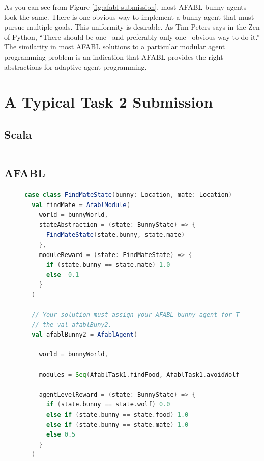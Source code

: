 As you can see from Figure \ref{fig:afabl-submission}, most AFABL bunny agents look the same. There is one obvious way to implement a bunny agent that must pursue multiple goals. This uniformity is desirable. As Tim Peters says in the Zen of Python, ``There should be one-- and preferably only one --obvious way to do it.'' The similarity in most AFABL solutions to a particular modular agent programming problem is an indication that AFABL provides the right abstractions for adaptive agent programming.

\section{A Typical Task 2 Submission}

\subsection{Scala}

\begin{figure}[h]
\begin{center}

\begin{lstlisting}[language=Scala]

\end{lstlisting}

\caption{}
\end{center}
\label{fig:scala-task2-submission}
\end{figure}


\subsection{AFABL}

\begin{figure}[h]
\begin{center}

\begin{lstlisting}[language=Scala]
  case class FindMateState(bunny: Location, mate: Location)
  val findMate = AfablModule(
    world = bunnyWorld,
    stateAbstraction = (state: BunnyState) => {
      FindMateState(state.bunny, state.mate)
    },
    moduleReward = (state: FindMateState) => {
      if (state.bunny == state.mate) 1.0
      else -0.1
    }
  )

  // Your solution must assign your AFABL bunny agent for Task 2 to
  // the val afablBuny2.
  val afablBunny2 = AfablAgent(

    world = bunnyWorld,

    modules = Seq(AfablTask1.findFood, AfablTask1.avoidWolf, findMate),

    agentLevelReward = (state: BunnyState) => {
      if (state.bunny == state.wolf) 0.0
      else if (state.bunny == state.food) 1.0
      else if (state.bunny == state.mate) 1.0
      else 0.5
    }
  )
\end{lstlisting}

\caption{}
\end{center}
\label{fig:afabl-task2-submission}
\end{figure}

